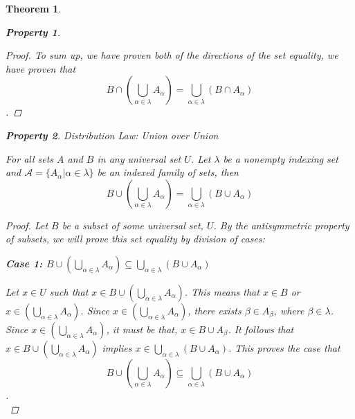 \documentclass{book}
\newtheorem{theorem}{Theorem}[section]
\newtheorem{property}{Property}[theorem]
\theoremstyle{definition}
\theoremstyle{remark}
\newcommand{\cc}[1]{\mathcal{#1}}
\begin{document}
\begin{theorem}
\begin{property}
\begin{proof}
            To sum up, we have proven both of the directions of the set equality, we have proven that $$B \cap \left ( \bigcup_{\alpha \in \lambda}{A_{\alpha}} \right ) = \bigcup_{\alpha \in \lambda}{(B \cap A_{\alpha})}$$. 
        \end{proof}
    \end{property}
    
    \newpage
    \begin{property}
    Distribution Law: Union over Union \\
        \begin{tcolorbox}
            For all sets $A$ and $B$ in any universal set $U$. Let $\lambda$ be a nonempty indexing set and $\cc{A} = \{ A_{\alpha} | \alpha \in \lambda \}$ be an indexed family of sets, then
                \begin{equation*}
                    B \cup \left ( \bigcup_{\alpha \in \lambda}{A_{\alpha}} \right ) = \bigcup_{\alpha \in \lambda}{(B \cup A_{\alpha})}
                \end{equation*}
        \end{tcolorbox}
    
        \begin{proof}
            Let $B$ be a subset of some universal set, $U$. By the antisymmetric property of subsets, we will prove this set equality by division of cases: \\
            
            \begin{flushleft} \textbf{Case 1: $B \cup \left ( \bigcup_{\alpha \in \lambda}{A_{\alpha}} \right ) \subseteq \bigcup_{\alpha \in \lambda}{(B \cup A_{\alpha})}$} \end{flushleft}
                Let $x \in U$ such that $x \in B \cup \left ( \bigcup_{\alpha \in \lambda}{A_{\alpha}} \right )$. This means that $x \in B$ or $x \in \left ( \bigcup_{\alpha \in \lambda}{A_{\alpha}} \right )$. Since $x \in \left ( \bigcup_{\alpha \in \lambda}{A_{\alpha}} \right )$, there exists $\beta \in A_{\beta}$, where $\beta \in \lambda$. Since $x \in \left ( \bigcup_{\alpha \in \lambda}{A_{\alpha}} \right )$, it must be that, $x \in B \cup A_{\beta}$. It follows that $x \in B \cup \left ( \bigcup_{\alpha \in \lambda}{A_{\alpha}} \right )$ implies $x \in \bigcup_{\alpha \in \lambda}{(B \cup A_{\alpha})}$. This proves the case that $$B \cup \left ( \bigcup_{\alpha \in \lambda}{A_{\alpha}} \right ) \subseteq \bigcup_{\alpha \in \lambda}{(B \cup A_{\alpha})}$$. \\
                

\end{proof}
\end{property}
\end{theorem}
\end{document}
